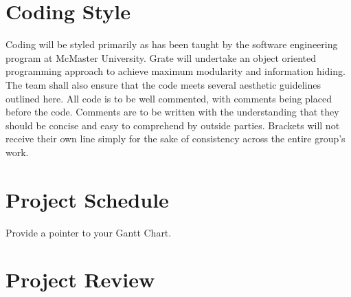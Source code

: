 \documentclass{article}
\begin{document}
\section{Coding Style}

Coding will be styled primarily as has been taught by the software engineering 
program at McMaster University. Grate will undertake an object oriented 
programming approach to achieve maximum modularity and information hiding. The 
team shall also ensure that the code meets several aesthetic guidelines outlined 
here. All code is to be well commented, with comments being placed before the 
code. Comments are to be written with the understanding that they should be 
concise and easy to comprehend by outside parties. Brackets will not receive 
their own line simply for the sake of consistency across the entire group’s 
work.

\section{Project Schedule}

Provide a pointer to your Gantt Chart.

\section{Project Review}
\end{document}
